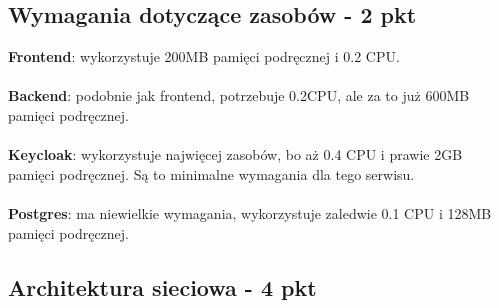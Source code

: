 \documentclass[12pt,a4paper]{article}
\begin{document}
\subsection{Wymagania dotyczące zasobów - 2 pkt}
\label{sec:ExampleTables}


\textbf{Frontend}: wykorzystuje 200MB pamięci podręcznej i 0.2 CPU.\\
\\
\textbf{Backend}: podobnie jak frontend, potrzebuje 0.2CPU, ale za to już 600MB pamięci podręcznej.\\
\\
\textbf{Keycloak}: wykorzystuje najwięcej zasobów, bo aż 0.4 CPU i prawie 2GB pamięci podręcznej. Są to minimalne wymagania dla tego serwisu.\\
\\
\textbf{Postgres}: ma niewielkie wymagania, wykorzystuje zaledwie 0.1 CPU i 128MB pamięci podręcznej.\\


\subsection{Architektura sieciowa - 4 pkt}
\label{sec:ExampleResults}


\noindent



\nocite{*}
\end{document}
